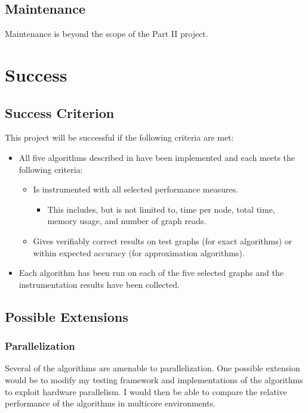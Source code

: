 \documentclass[a4paper,12pt]{article}
\begin{document}
\subsection{Maintenance}

Maintenance is beyond the scope of the Part II project.

\section{Success}
\label{success}
\subsection{Success Criterion}

This project will be successful if the following criteria are met:
\begin{itemize}
\item All five algorithms described in  have been implemented and each meets the following criteria:
\begin{itemize}
\item Is instrumented with all selected performance measures.
\begin{itemize}
\item This includes, but is not limited to, time per node, total time, memory usage, and number of graph reads.
\end{itemize}
\item Gives verifiably correct results on test graphs (for exact algorithms) or within expected accuracy (for approximation algorithms).
\end{itemize}

\item Each algorithm has been run on each of the five selected graphs and the instrumentation results have been collected.
\end{itemize}

\subsection{Possible Extensions}
\subsubsection*{Parallelization}
Several of the algorithms are amenable to parallelization. One possible extension would be to modify my testing framework and implementations of the algorithms to exploit hardware parallelism. I would then be able to compare the relative performance of the algorithms in multicore environments.
\end{document}
